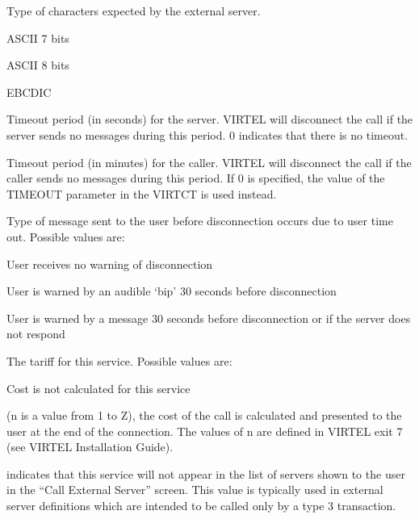 \documentclass[letterpaper,10pt,english]{sphinxmanual}
\begin{document}
\begin{description}
\sphinxAtStartPar
Type of characters expected by the external server.
\begin{description}
\sphinxAtStartPar
ASCII 7 bits

\sphinxAtStartPar
ASCII 8 bits

\sphinxAtStartPar
EBCDIC

\end{description}

\sphinxAtStartPar
Timeout period (in seconds) for the server. VIRTEL will disconnect the call if the server sends no messages during this period. 0 indicates that there is no timeout.

\sphinxAtStartPar
Timeout period (in minutes) for the caller. VIRTEL will disconnect the call if the caller sends no messages during this period. If 0 is specified, the value of the TIMEOUT parameter in the VIRTCT is used instead.

\sphinxAtStartPar
Type of message sent to the user before disconnection occurs due to user time out. Possible values are:
\begin{description}
\sphinxAtStartPar
User receives no warning of disconnection

\sphinxAtStartPar
User is warned by an audible ‘bip’ 30 seconds before disconnection

\sphinxAtStartPar
User is warned by a message 30 seconds before disconnection or if the server does not respond

\end{description}

\sphinxAtStartPar
The tariff for this service. Possible values are:
\begin{description}
\sphinxAtStartPar
Cost is not calculated for this service

\sphinxAtStartPar
(n is a value from 1 to Z), the cost of the call is calculated and presented to the user at the end of the connection. The values of n are defined in VIRTEL exit 7 (see VIRTEL Installation Guide).

\end{description}

 indicates that this service will not appear in the list of servers shown to the user in the “Call External Server” screen. This value is typically used in external server definitions which are intended to be called only by a type 3 transaction.


\end{description}
\end{document}
